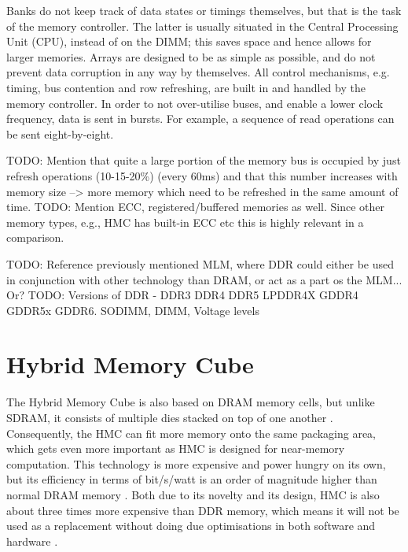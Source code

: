 Banks do not keep track of data states or timings themselves, but that is the task of the memory controller. The latter is usually situated in the Central Processing Unit (CPU), instead of on the DIMM; this saves space and hence allows for larger memories. Arrays are designed to be as simple as possible, and do not prevent data corruption in any way by themselves. All control mechanisms, e.g. timing, bus contention and row refreshing, are built in and handled by the memory controller. In order to not over-utilise buses, and enable a lower clock frequency, data is sent in bursts. For example, a sequence of read operations can be sent eight-by-eight. 

TODO: Mention that quite a large portion of the memory bus is occupied by just refresh operations (10-15-20\%) (every 60ms) and that this number increases with memory size --> more memory which need to be refreshed in the same amount of time.
TODO: Mention ECC, registered/buffered memories as well. Since other memory types, e.g., HMC has built-in ECC etc this is highly relevant in a comparison. 
\bigskip

TODO: Reference previously mentioned MLM, where DDR could either be used in conjunction with other technology than DRAM, or act as a part os the MLM... Or?
TODO: Versions of DDR - DDR3 DDR4 DDR5 LPDDR4X GDDR4 GDDR5x GDDR6. SODIMM, DIMM, Voltage levels

\section{Hybrid Memory Cube}
The Hybrid Memory Cube is also based on DRAM memory cells, but unlike SDRAM, it consists of multiple dies stacked on top of one another \cite{hybrid2013hybrid}. Consequently, the HMC can fit more memory onto the same packaging area, which gets even more important as HMC is designed for near-memory computation. This technology is more expensive and power hungry on its own, but its efficiency in terms of bit/s/watt is an order of magnitude higher than normal DRAM memory \cite{7477494}. Both due to its novelty and its design, HMC is also about three times more expensive than DDR memory, which means it will not be used as a replacement without doing due optimisations in both software and hardware \cite{Jayaraj:2015:PPM:2818950.2818976}.

